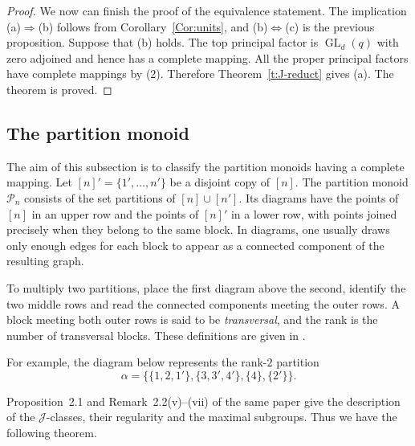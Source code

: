 \documentclass[11pt]{article}
\theoremstyle{plain}
\theoremstyle{remark}
\theoremstyle{definition}
\theoremstyle{plain}
\begin{document}
\begin{proof}
We now can finish the proof of the equivalence statement. The implication (a)$\Rightarrow$(b) follows from
Corollary~\ref{Cor:units}, and (b)$\Leftrightarrow$(c) is the previous
proposition. Suppose that (b) holds. The top principal factor is
$\operatorname{GL}_d(q)$ with zero adjoined and hence has a complete mapping.
All the proper principal factors have complete mappings by (2). Therefore
Theorem~\ref{t:J-reduct} gives (a). The theorem is proved.
\end{proof}

\subsection{The partition monoid}

The aim of this subsection is to classify the partition monoids having a
complete mapping. Let $[n]'=\{1',\ldots,n'\}$ be a disjoint copy of $[n]$.
The partition monoid $\mathcal P_n$ consists of the set partitions of
$[n]\cup[n']$. Its diagrams have the points of $[n]$ in an upper row and
the points of $[n]'$ in a lower row, with points joined precisely when they
belong to the same block. {In diagrams, one usually draws only enough edges for each block to appear as a connected component of the resulting graph.}

To multiply two partitions, place the first
diagram above the second, identify the two middle rows and read the connected
components meeting the outer rows. A block meeting both outer rows is said
to be \emph{transversal}, and the rank is the number of transversal blocks.
These definitions are given in
\cite[Section~2.1]{EastMitchellRuskucTorpey}.


\begingroup
\color{black}
For example, the diagram below represents the rank-$2$ partition
\[
\alpha=\{\{1,2,1'\},\{3,3',4'\},\{4\},\{2'\}\}.
\]
\endgroup
\begin{center}
\end{center}

Proposition~2.1 and Remark~2.2(v)--(vii) of the same
paper give the description of the $\mathcal J$-classes, their regularity and
the maximal subgroups. Thus we have the following theorem.
\end{document}
